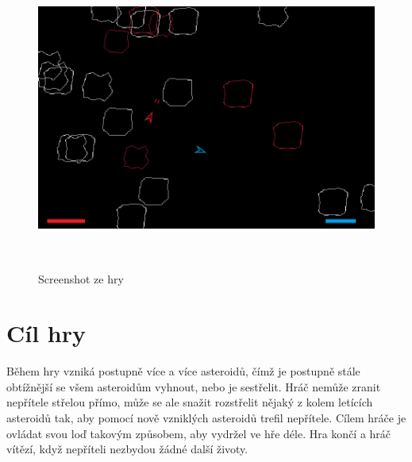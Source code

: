 \begin{figure}[p]

\includegraphics[width=150mm, height=100mm]{./Obrazky/UkazkaHry.png}
\caption{Screenshot ze hry}
\label{obr01:}
\end{figure}


\section{Cíl hry}
Během hry vzniká postupně více a více asteroidů, čímž je postupně stále obtížnější se všem asteroidům vyhnout, nebo je sestřelit.
Hráč nemůže zranit nepřítele střelou přímo, může se ale snažit rozstřelit nějaký z kolem letících asteroidů tak, aby pomocí nově vzniklých asteroidů trefil nepřítele.
Cílem hráče je ovládat svou loď takovým způsobem, aby vydržel ve hře déle. Hra končí a hráč vítězí, když nepříteli nezbydou žádné další životy.

